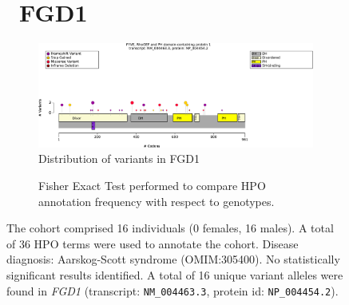 \begin{figure}[htbp]
\section*{ FGD1}
\centering
\begin{subfigure}[b]{0.95\textwidth}
\centering
\includegraphics[width=\textwidth]{ img/FGD1_protein_diagram.pdf} 
\captionsetup{justification=raggedright,singlelinecheck=false}
\caption{Distribution of variants in FGD1}
\end{subfigure}

\vspace{2em}

\begin{subfigure}[b]{0.95\textwidth}
\centering
{}
\captionsetup{justification=raggedright,singlelinecheck=false}
\caption{Fisher Exact Test performed to compare HPO annotation frequency with respect to genotypes. }
\end{subfigure}

\vspace{2em}

\caption{ The cohort comprised 16 individuals (0 females, 16 males). A total of 36 HPO terms were used to annotate the cohort. Disease diagnosis: Aarskog-Scott syndrome (OMIM:305400). No statistically significant results identified. A total of 16 unique variant alleles were found in \textit{FGD1} (transcript: \texttt{NM\_004463.3}, protein id: \texttt{NP\_004454.2}).}
\end{figure}
